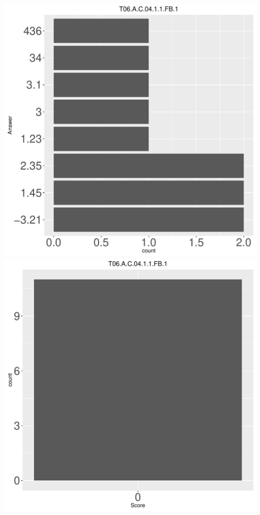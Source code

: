 \documentclass[12pt,english,nohyper]{tufte-handout}\usepackage[]{graphicx}\usepackage[]{color}
\begin{document}
\begin{center} \includegraphics[width=.45\linewidth]{Topic06_AB_9_answer} \includegraphics[width=.45\linewidth]{Topic06_AB_9_score} \end{center} 
\end{document}
